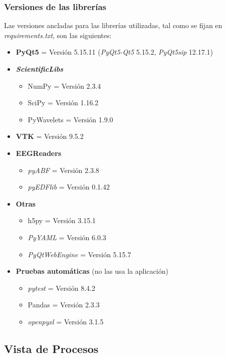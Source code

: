 \documentclass[12pt,letterpaper,oneside]{article}
\DeclareRobustCommand{\_}{\textunderscore\allowbreak}
\begin{document}
\subsubsection{Versiones de las librer\'ias}

Las versiones ancladas para las librer\'ias utilizadas, tal como se fijan en \textit{requirements.txt}, son las siguientes:

\begin{itemize}
    \item \textbf{PyQt5} = Versi\'on 5.15.11 (\textit{PyQt5-Qt5} 5.15.2, \textit{PyQt5\_sip} 12.17.1)
    \item \textbf{\textit{ScientificLibs}}
    \begin{itemize}
        \item NumPy = Versi\'on 2.3.4
        \item SciPy = Versi\'on 1.16.2
        \item PyWavelets = Versi\'on 1.9.0
    \end{itemize}
    \item \textbf{VTK} = Versi\'on 9.5.2
    \item \textbf{EEGReaders}
    \begin{itemize}
        \item \textit{pyABF} = Versi\'on 2.3.8
        \item \textit{pyEDFlib} = Versi\'on 0.1.42
    \end{itemize}
    \item \textbf{Otras}
    \begin{itemize}
        \item h5py = Versi\'on 3.15.1
        \item \textit{PyYAML} = Versi\'on 6.0.3
        \item \textit{PyQtWebEngine} = Versi\'on 5.15.7
    \end{itemize}
    \item \textbf{Pruebas automáticas} (no las usa la aplicación)
    \begin{itemize}
        \item \textit{pytest} = Versi\'on 8.4.2
        \item Pandas = Versi\'on 2.3.3
        \item \textit{openpyxl} = Versi\'on 3.1.5
    \end{itemize}
\end{itemize}

\subsection{Vista de Procesos}
\end{document}
